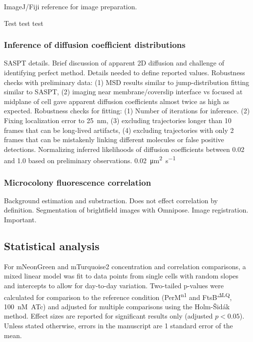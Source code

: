 \documentclass[pdflatex,sn-basic]{sn-jnl}%
\newcommand\ftsbdLQ{FtsB\textsuperscript{$\Delta{}$LQ}}
\newcommand\permN{PerM\textsuperscript{n1}}
\begin{document}
ImageJ/Fiji reference for image preparation.

Test test test

\loremipsum{}

\subsubsection{Inference of diffusion coefficient distributions}

SASPT details.
Brief discussion of apparent 2D diffusion and challenge of identifying perfect method.
Details needed to define reported values.
Robustness checks with preliminary data: (1) MSD results similar to jump-distribution fitting similar to SASPT, (2) imaging near membrane/coverslip interface vs focused at midplane of cell gave apparent diffusion coefficients almost twice as high as expected.
Robustness checks for fitting: (1) Number of iterations for inference. (2) Fixing localization error to \qty{25}{nm}, (3) excluding trajectories longer than 10 frames that can be long-lived artifacts, (4) excluding trajectories with only 2 frames that can be mistakenly linking different molecules or false positive detections.
Normalizing inferred likelihoods of diffusion coefficients between 0.02 and 1.0 based on preliminary observations.
\qty{0.02}{\square\um\per\s}

\loremipsum{} 

\subsubsection{Microcolony fluorescence correlation}

Background estimation and substraction. Does not effect correlation by definition.
Segmentation of brightfield images with Omnipose.
Image registration. Important.

\loremipsum{} 

\subsection{Statistical analysis}

For mNeonGreen and mTurquoise2 concentration and correlation comparisons, a mixed linear model was fit to data points from single cells with random slopes and intercepts to allow for day-to-day variation. Two-tailed p-values were calculated for comparison to the reference condition (\permN{} and \ftsbdLQ{}, 100~nM~ATc) and adjusted for multiple comparisons using the Holm-Šidák method. Effect sizes are reported for significant results only (adjusted $p<0.05$). Unless stated otherwise, errors in the manuscript are 1 standard error of the mean.
\end{document}
